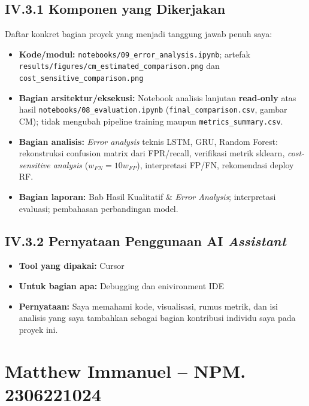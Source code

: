 \documentclass[11pt,a4paper,oneside]{report}
\begin{document}
\subsection*{IV.3.1 Komponen yang Dikerjakan}
Daftar konkret bagian proyek yang menjadi tanggung jawab penuh saya:
\begin{itemize}[leftmargin=*]
    \item \textbf{Kode/modul:} \texttt{notebooks/09\_error\_analysis.ipynb}; artefak \texttt{results/figures/cm\_estimated\_comparison.png} dan \texttt{cost\_sensitive\_comparison.png}
    \item \textbf{Bagian arsitektur/eksekusi:} Notebook analisis lanjutan \textbf{read-only} atas hasil \texttt{notebooks/08\_evaluation.ipynb} (\texttt{final\_comparison.csv}, gambar CM); tidak mengubah pipeline training maupun \texttt{metrics\_summary.csv}.
    \item \textbf{Bagian analisis:} \textit{Error analysis} teknis LSTM, GRU, Random Forest: rekonstruksi confusion matrix dari FPR/recall, verifikasi metrik sklearn, \textit{cost-sensitive analysis} ($w_{FN}=10w_{FP}$), interpretasi FP/FN, rekomendasi deploy RF.
    \item \textbf{Bagian laporan:} Bab Hasil Kualitatif \& \textit{Error Analysis}; interpretasi evaluasi; pembahasan perbandingan model.
\end{itemize}

\subsection*{IV.3.2 Pernyataan Penggunaan AI \textit{Assistant}}
\begin{itemize}[leftmargin=*]
    \item \textbf{Tool yang dipakai:} Cursor
    \item \textbf{Untuk bagian apa:} Debugging dan enivironment IDE
    \item \textbf{Pernyataan:} Saya memahami kode, visualisasi, rumus metrik, dan isi analisis yang saya tambahkan sebagai bagian kontribusi individu saya pada proyek ini.
\end{itemize}

\section{Matthew Immanuel -- NPM. 2306221024}
\end{document}
